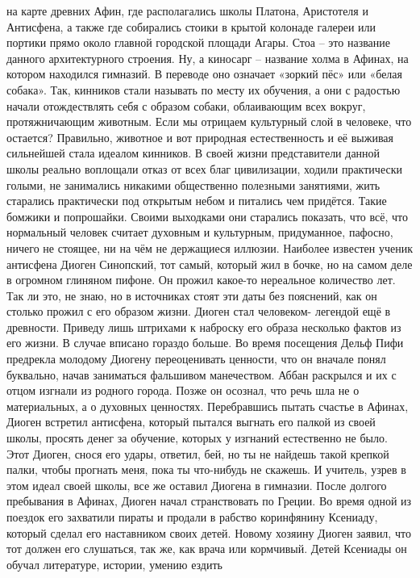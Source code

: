 на карте древних Афин, где располагались школы Платона, Аристотеля и Антисфена,
а также где собирались стоики в крытой колонаде галереи или портики прямо около
главной городской площади Агары. Стоа – это название данного архитектурного
строения. Ну, а киносарг – название холма в Афинах, на котором находился
гимназий. В переводе оно означает «зоркий пёс» или «белая собака». Так, кинников
стали называть по месту их обучения, а они с радостью начали отождествлять себя
с образом собаки, облаивающим всех вокруг, протяжничающим животным. Если мы
отрицаем культурный слой в человеке, что остается? Правильно, животное и вот
природная естественность и её выживая сильнейшей стала идеалом кинников. В своей
жизни представители данной школы реально воплощали отказ от всех благ
цивилизации, ходили практически голыми, не занимались никакими общественно
полезными занятиями, жить старались практически под открытым небом и питались
чем придётся. Такие бомжики и попрошайки. Своими выходками они старались
показать, что всё, что нормальный человек считает духовным и культурным,
придуманное, пафосно, ничего не стоящее, ни на чём не держащиеся иллюзии.
Наиболее известен ученик антисфена Диоген Синопский, тот самый, который жил в
бочке, но на самом деле в огромном глиняном пифоне. Он прожил какое-то
нереальное количество лет. Так ли это, не знаю, но в источниках стоят эти даты
без пояснений, как он столько прожил с его образом жизни. Диоген стал человеком-
легендой ещё в древности. Приведу лишь штрихами к наброску его образа несколько
фактов из его жизни. В случае вписано гораздо больше. Во время посещения Дельф
Пифи предрекла молодому Диогену переоценивать ценности, что он вначале понял
буквально, начав заниматься фальшивом манечеством. Аббан раскрылся и их с отцом
изгнали из родного города. Позже он осознал, что речь шла не о материальных, а о
духовных ценностях. Перебравшись пытать счастье в Афинах, Диоген встретил
антисфена, который пытался выгнать его палкой из своей школы, просять денег за
обучение, которых у изгнаний естественно не было. Этот Диоген, снося его удары,
ответил, бей, но ты не найдешь такой крепкой палки, чтобы прогнать меня, пока ты
что-нибудь не скажешь. И учитель, узрев в этом идеал своей школы, все же оставил
Диогена в гимназии. После долгого пребывания в Афинах, Диоген начал
странствовать по Греции. Во время одной из поездок его захватили пираты и
продали в рабство коринфянину Ксениаду, который сделал его наставником своих
детей. Новому хозяину Диоген заявил, что тот должен его слушаться, так же, как
врача или кормчивый. Детей Ксениады он обучал литературе, истории, умению ездить
